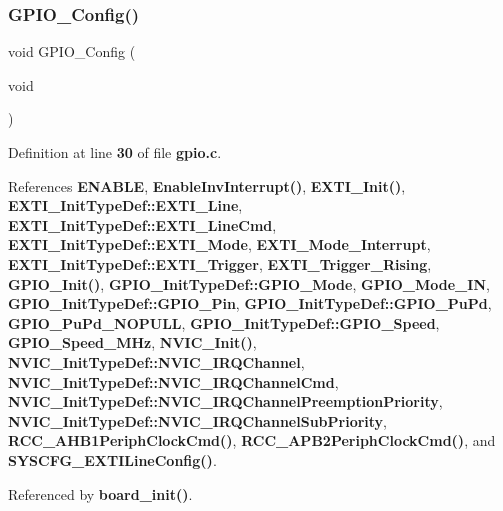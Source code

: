 \subsubsection{G\+P\+I\+O\+\_\+\+Config()}
{\footnotesize\ttfamily void G\+P\+I\+O\+\_\+\+Config (\begin{DoxyParamCaption}\item[{void}]{ }\end{DoxyParamCaption})}



Definition at line \textbf{ 30} of file \textbf{ gpio.\+c}.



References \textbf{ E\+N\+A\+B\+LE}, \textbf{ Enable\+Inv\+Interrupt()}, \textbf{ E\+X\+T\+I\+\_\+\+Init()}, \textbf{ E\+X\+T\+I\+\_\+\+Init\+Type\+Def\+::\+E\+X\+T\+I\+\_\+\+Line}, \textbf{ E\+X\+T\+I\+\_\+\+Init\+Type\+Def\+::\+E\+X\+T\+I\+\_\+\+Line\+Cmd}, \textbf{ E\+X\+T\+I\+\_\+\+Init\+Type\+Def\+::\+E\+X\+T\+I\+\_\+\+Mode}, \textbf{ E\+X\+T\+I\+\_\+\+Mode\+\_\+\+Interrupt}, \textbf{ E\+X\+T\+I\+\_\+\+Init\+Type\+Def\+::\+E\+X\+T\+I\+\_\+\+Trigger}, \textbf{ E\+X\+T\+I\+\_\+\+Trigger\+\_\+\+Rising}, \textbf{ G\+P\+I\+O\+\_\+\+Init()}, \textbf{ G\+P\+I\+O\+\_\+\+Init\+Type\+Def\+::\+G\+P\+I\+O\+\_\+\+Mode}, \textbf{ G\+P\+I\+O\+\_\+\+Mode\+\_\+\+IN}, \textbf{ G\+P\+I\+O\+\_\+\+Init\+Type\+Def\+::\+G\+P\+I\+O\+\_\+\+Pin}, \textbf{ G\+P\+I\+O\+\_\+\+Init\+Type\+Def\+::\+G\+P\+I\+O\+\_\+\+Pu\+Pd}, \textbf{ G\+P\+I\+O\+\_\+\+Pu\+Pd\+\_\+\+N\+O\+P\+U\+LL}, \textbf{ G\+P\+I\+O\+\_\+\+Init\+Type\+Def\+::\+G\+P\+I\+O\+\_\+\+Speed}, \textbf{ G\+P\+I\+O\+\_\+\+Speed\+\_\+M\+Hz}, \textbf{ N\+V\+I\+C\+\_\+\+Init()}, \textbf{ N\+V\+I\+C\+\_\+\+Init\+Type\+Def\+::\+N\+V\+I\+C\+\_\+\+I\+R\+Q\+Channel}, \textbf{ N\+V\+I\+C\+\_\+\+Init\+Type\+Def\+::\+N\+V\+I\+C\+\_\+\+I\+R\+Q\+Channel\+Cmd}, \textbf{ N\+V\+I\+C\+\_\+\+Init\+Type\+Def\+::\+N\+V\+I\+C\+\_\+\+I\+R\+Q\+Channel\+Preemption\+Priority}, \textbf{ N\+V\+I\+C\+\_\+\+Init\+Type\+Def\+::\+N\+V\+I\+C\+\_\+\+I\+R\+Q\+Channel\+Sub\+Priority}, \textbf{ R\+C\+C\+\_\+\+A\+H\+B1\+Periph\+Clock\+Cmd()}, \textbf{ R\+C\+C\+\_\+\+A\+P\+B2\+Periph\+Clock\+Cmd()}, and \textbf{ S\+Y\+S\+C\+F\+G\+\_\+\+E\+X\+T\+I\+Line\+Config()}.



Referenced by \textbf{ board\+\_\+init()}.


